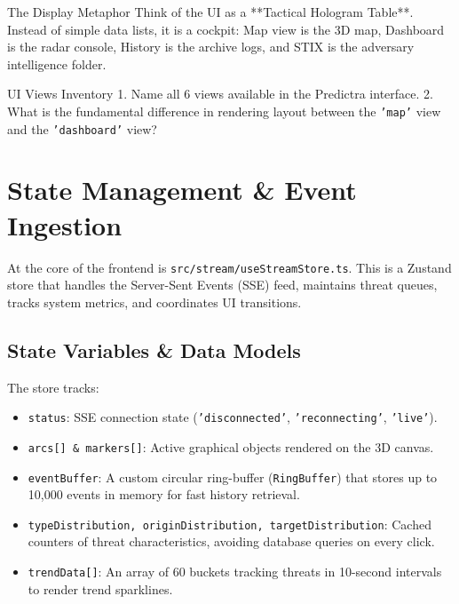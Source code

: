 \documentclass[11pt,a4paper]{report}
\begin{document}
\begin{memoryanchor}{The Display Metaphor}
  Think of the UI as a **Tactical Hologram Table**. Instead of simple data lists, it is a cockpit: Map view is the 3D map, Dashboard is the radar console, History is the archive logs, and STIX is the adversary intelligence folder.
\end{memoryanchor}

\begin{activerecall}{UI Views Inventory}
  1. Name all 6 views available in the Predictra interface.
  2. What is the fundamental difference in rendering layout between the \texttt{'map'} view and the \texttt{'dashboard'} view?
\end{activerecall}

\newpage

\chapter{State Management \& Event Ingestion}

At the core of the frontend is \texttt{src/stream/useStreamStore.ts}. This is a Zustand store that handles the Server-Sent Events (SSE) feed, maintains threat queues, tracks system metrics, and coordinates UI transitions.

\section{State Variables \& Data Models}
The store tracks:
\begin{itemize}
  \item \texttt{status}: SSE connection state (\texttt{'disconnected'}, \texttt{'reconnecting'}, \texttt{'live'}).
  \item \texttt{arcs[] \& markers[]}: Active graphical objects rendered on the 3D canvas.
  \item \texttt{eventBuffer}: A custom circular ring-buffer (\texttt{RingBuffer}) that stores up to 10,000 events in memory for fast history retrieval.
  \item \texttt{typeDistribution, originDistribution, targetDistribution}: Cached counters of threat characteristics, avoiding database queries on every click.
  \item \texttt{trendData[]}: An array of 60 buckets tracking threats in 10-second intervals to render trend sparklines.
\end{itemize}
\end{document}
